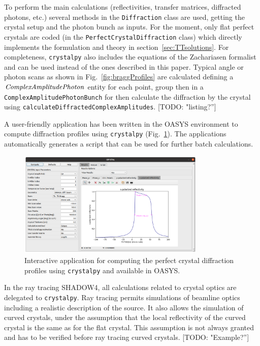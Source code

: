 \documentclass[preprint]{iucr}              %
\newcommand{\todo}[1]{{\color{red}[TODO: "#1'']}}
\begin{document}
To perform the main calculations (reflectivities, transfer matrices, diffracted photons, etc.) several methods in the {\tt Diffraction} class are used, getting the crystal setup and the photon bunch as inputs. For the moment, only flat perfect crystals are coded (in the {\tt PerfectCrystalDiffraction} class) which directly implements the formulation and theory in section~\ref{sec:TTsolutions}. For completeness, {\tt crystalpy} also includes the equations of the Zachariasen formalist~\cite{ZachariasenBook} and can be used instead of the ones described in this paper.
Typical angle or photon scans as shown in Fig.~\ref{fig:braggProfiles} are calculated defining a $\tt ComplexAmplitudePhoton$ entity for each point, group then in a {\tt ComplexAmplitudePhotonBunch} for then calculate the diffraction by the crystal using {\tt calculateDiffractedComplexAmplitudes}. \todo{listing?} 

A user-friendly application has been written in the OASYS environment to compute diffraction profiles using {\tt crystalpy} (Fig.~\ref{fig:xcrystal}). The applications automatically generates a script that can be used for further batch calculations. 

\begin{figure}
    \centering
    \includegraphics[width=0.8\textwidth]{figures/xcrystal.png}
    \caption{Interactive application for computing the perfect crystal diffraction profiles using {\tt crystalpy} and available in OASYS.  }
    \label{fig:xcrystal}
\end{figure}

In the ray tracing SHADOW4, all calculations related to crystal optics are delegated to  {\tt crystalpy}. Ray tracing permits simulations of beamline optics including a realistic description of the source. It also allows the simulation of curved crystals, under the assumption that the local reflectivity of the curved crystal is the same as for the flat crystal. This assumption is not always granted and has to be verified before ray tracing curved crystals. \todo{Example?}
\end{document}
